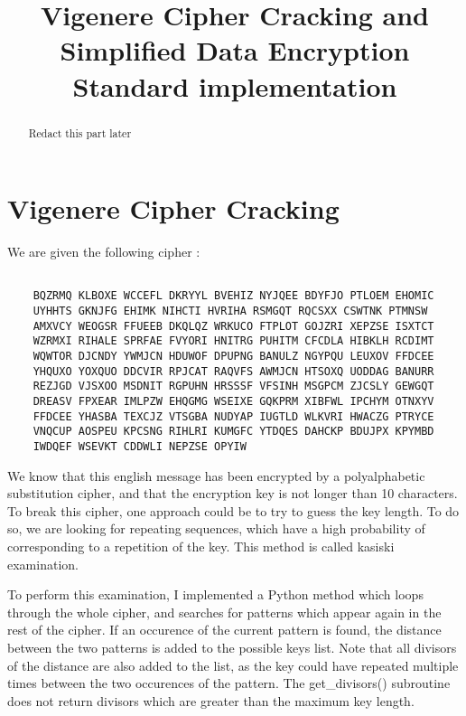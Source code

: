 \documentclass{article}
\title{\textbf{Vigenere Cipher Cracking and Simplified Data Encryption Standard implementation}}
\author{}
\date{}
\begin{document}
\maketitle \thispagestyle{fancy}

\begin{abstract}
    Redact this part later
    
\end{abstract}

\section{Vigenere Cipher Cracking}

We are given the following cipher :

\begin{verbatim}

    BQZRMQ KLBOXE WCCEFL DKRYYL BVEHIZ NYJQEE BDYFJO PTLOEM EHOMIC
    UYHHTS GKNJFG EHIMK NIHCTI HVRIHA RSMGQT RQCSXX CSWTNK PTMNSW
    AMXVCY WEOGSR FFUEEB DKQLQZ WRKUCO FTPLOT GOJZRI XEPZSE ISXTCT
    WZRMXI RIHALE SPRFAE FVYORI HNITRG PUHITM CFCDLA HIBKLH RCDIMT
    WQWTOR DJCNDY YWMJCN HDUWOF DPUPNG BANULZ NGYPQU LEUXOV FFDCEE
    YHQUXO YOXQUO DDCVIR RPJCAT RAQVFS AWMJCN HTSOXQ UODDAG BANURR
    REZJGD VJSXOO MSDNIT RGPUHN HRSSSF VFSINH MSGPCM ZJCSLY GEWGQT
    DREASV FPXEAR IMLPZW EHQGMG WSEIXE GQKPRM XIBFWL IPCHYM OTNXYV
    FFDCEE YHASBA TEXCJZ VTSGBA NUDYAP IUGTLD WLKVRI HWACZG PTRYCE
    VNQCUP AOSPEU KPCSNG RIHLRI KUMGFC YTDQES DAHCKP BDUJPX KPYMBD
    IWDQEF WSEVKT CDDWLI NEPZSE OPYIW

\end{verbatim}

We know that this english message has been encrypted by a polyalphabetic substitution cipher, and that the encryption key is not longer than 10 characters. To break this cipher, one approach could be to try to guess the key length. To do so, we are looking for repeating sequences, which have a high probability of corresponding to a repetition of the key. This method is called kasiski examination.\cite{vigenere}

To perform this examination, I implemented a Python method which loops through the whole cipher, and searches for patterns which appear again in the rest of the cipher. If an occurence of the current pattern is found, the distance between the two patterns is added to the possible keys list. Note that all divisors of the distance are also added to the list, as the key could have repeated multiple times between the two occurences of the pattern. The get\_divisors() subroutine does not return divisors which are greater than the maximum key length.
\end{document}
